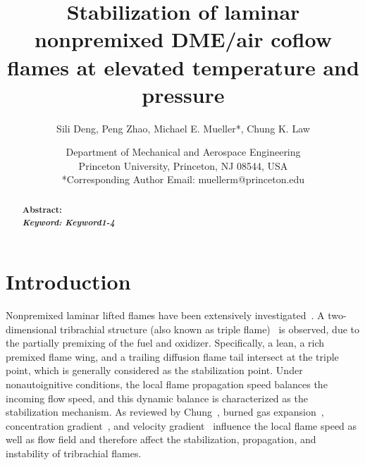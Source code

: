 \documentclass{wssci}
\begin{document}
\title{Stabilization of laminar nonpremixed DME/air coflow flames at elevated temperature and pressure}

\author{
%
Sili Deng, Peng Zhao, Michael E. Mueller*, Chung K. Law 
%
}
\date{
Department of Mechanical and Aerospace Engineering\\
Princeton University, Princeton, NJ 08544, USA\\
*Corresponding Author Email: muellerm@princeton.edu
%
}

\maketitle
\thispagestyle{fancyplain}

\begin{abstract}
\textbf{Abstract: }\\
\textbf{\textit{Keyword: Keyword1-4}}
\end{abstract}


\section{Introduction}

Nonpremixed laminar lifted flames have been extensively investigated~\cite{chung07}.  A two-dimensional tribrachial structure (also known as triple flame)~\cite{buckmaster02} is observed, due to the partially premixing of the fuel and oxidizer.  Specifically, a lean, a rich premixed flame wing, and a trailing diffusion flame tail intersect at the triple point, which is generally considered as the stabilization point.  Under nonautoignitive conditions, the local flame propagation speed balances the incoming flow speed, and this dynamic balance is characterized as the stabilization mechanism.  As reviewed by Chung~\cite{chung07}, burned gas expansion~\cite{ruetsch95,lee97,plessing98,kioni99}, concentration gradient~\cite{dold89,hartley91,ghosal00}, and velocity gradient~\cite{kim07} influence the local flame speed as well as flow field and therefore affect the stabilization, propagation, and instability of tribrachial flames.
\end{document}
